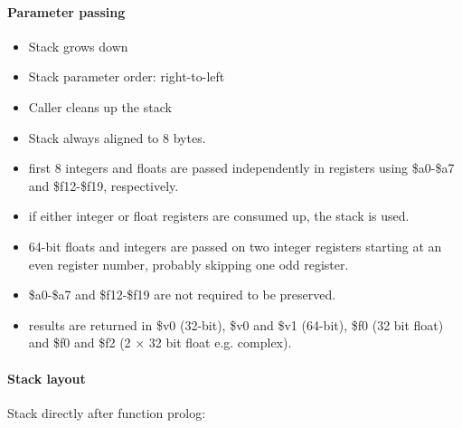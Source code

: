 \paragraph{Parameter passing}

\begin{itemize}
\item Stack grows down
\item Stack parameter order: right-to-left
\item Caller cleans up the stack
\item Stack always aligned to 8 bytes.
\item first 8 integers and floats are passed independently in registers using \$a0-\$a7 and \$f12-\$f19, respectively.
\item if either integer or float registers are consumed up, the stack is used.
\item 64-bit floats and integers are passed on two integer registers starting at an even register number, probably skipping one odd register.
\item \$a0-\$a7 and \$f12-\$f19 are not required to be preserved.
\item results are returned in \$v0 (32-bit), \$v0 and \$v1 (64-bit), \$f0 (32 bit float) and \$f0 and \$f2 (2 $\times$ 32 bit float e.g. complex).
\end{itemize}

\paragraph{Stack layout}

Stack directly after function prolog:\\

